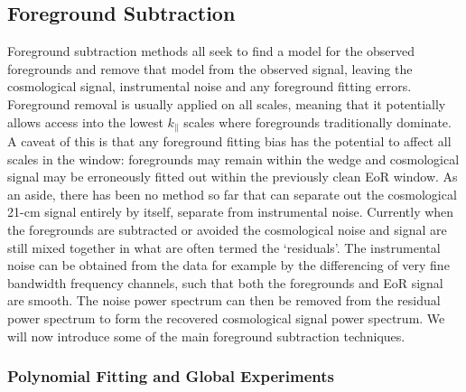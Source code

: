 \subsection{Foreground Subtraction}
Foreground subtraction methods all seek to find a model for the observed foregrounds and remove that model from the observed signal, leaving the cosmological signal, instrumental noise and any foreground fitting errors. Foreground removal is usually applied on all scales, meaning that it potentially allows access into the lowest $k_\parallel$ scales where foregrounds traditionally dominate. A caveat of this is that any foreground fitting bias has the potential to affect all scales in the window: foregrounds may remain within the wedge and cosmological signal may be erroneously fitted out within the previously clean EoR window. As an aside, there has been no method so far that can separate out the cosmological 21-cm signal entirely by itself, separate from instrumental noise. Currently when the foregrounds are subtracted or avoided the cosmological noise and signal are still mixed together in what are often termed the `residuals'. The instrumental noise can be obtained from the data for example by the differencing of very fine bandwidth frequency channels, such that both the foregrounds and EoR signal are smooth. The noise power spectrum can then be removed from the residual power spectrum to form the recovered cosmological signal power spectrum. We will now introduce some of the main foreground subtraction techniques.

\subsubsection{Polynomial Fitting and Global Experiments}
\label{sec:poly}

